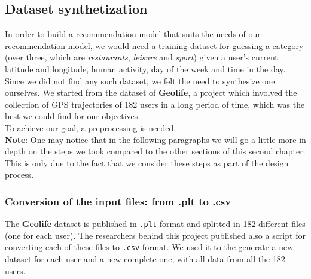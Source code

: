 \documentclass[../../main]{subfiles}
\begin{document}
\subsection{Dataset synthetization}
\label{ss:dataset-synthetization}

In order to build a recommendation model that suits the needs of our recommendation model, we would need a training dataset for guessing a category 
(over three, which are \textit{restaurants}, \textit{leisure} and \textit{sport}) given a user's current latitude and longitude, human activity, day of the week and time in the day.
Since we did not find any such dataset, we felt the need to synthesize one ourselves.
We started from the dataset of \textbf{Geolife}, a project which involved the collection of GPS trajectories of 182 users in a long period of time, which was the best we could find for our objectives.\\
To achieve our goal, a preprocessing is needed.\\
\textbf{Note}: One may notice that in the following paragraphs we will go a little more in depth on the steps we took compared to the other sections of this second chapter.
This is only due to the fact that we consider these steps as part of the design process.

\subsubsection{Conversion of the input files: from .plt to .csv}
\label{sss:conversion-input-files}
The \textbf{Geolife} dataset is published in \texttt{.plt} format and splitted in 182 different files (one for each user).
The researchers behind this project published also a script for converting each of these files to \texttt{.csv} format.
We used it to the generate a new dataset for each user and a new complete one, with all data from all the 182 users.
\end{document}
